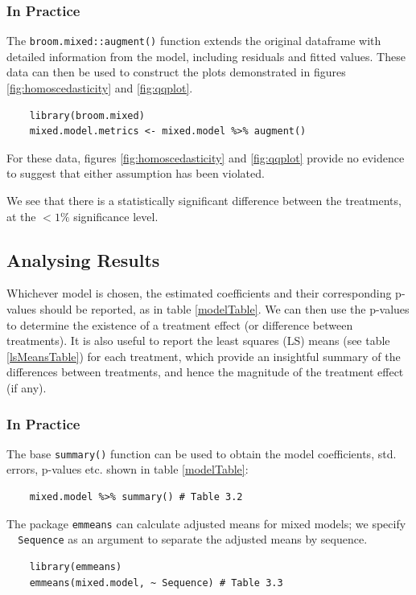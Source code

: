 \documentclass[12pt, TexShade, letterpaper]{report}
\begin{document}
\subsubsection{In Practice}
The \texttt{broom.mixed::augment()} function extends the original dataframe with detailed information from the model, including residuals and fitted values. These data can then be used to construct the plots demonstrated in figures \ref{fig:homoscedasticity} and \ref{fig:qqplot}.

\begin{verbatim}
    library(broom.mixed)
    mixed.model.metrics <- mixed.model %>% augment()
\end{verbatim}

For these data, figures \ref{fig:homoscedasticity} and \ref{fig:qqplot} provide no evidence to suggest that either assumption has been violated.

We see that there is a statistically significant difference between the treatments, at the $<1\%$ significance level.

\subsection{Analysing Results}
Whichever model is chosen, the estimated coefficients and their corresponding p-values should be reported, as in table \ref{modelTable}. We can then use the p-values to determine the existence of a treatment effect (or difference between treatments). It is also useful to report the least squares (LS) means (see table \ref{lsMeansTable}) for each treatment, which provide an insightful summary of the differences between treatments, and hence the magnitude of the treatment effect (if any).




\subsubsection{In Practice}
The base \texttt{summary()} function can be used to obtain the model coefficients, std. errors, p-values etc. shown in table \ref{modelTable}:
\begin{verbatim}
    mixed.model %>% summary() # Table 3.2
\end{verbatim}
The package \texttt{emmeans} can calculate adjusted means for mixed models; we specify \texttt{~ Sequence} as an argument to separate the adjusted means by sequence.
\begin{verbatim}
    library(emmeans)
    emmeans(mixed.model, ~ Sequence) # Table 3.3
\end{verbatim}
\end{document}
